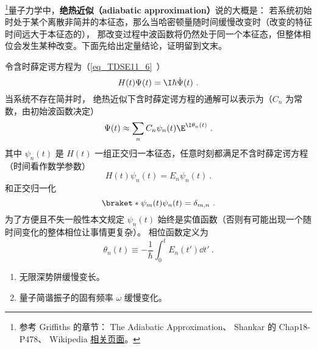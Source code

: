 
\begin{issues}
\issueTODO
\end{issues}


\footnote{参考 Griffiths\cite{GriffE} 的章节： The Adiabatic Approximation、 Shankar\cite{Shankar} 的 Chap18-P478、 Wikipedia \href{https://en.wikipedia.org/wiki/Adiabatic_theorem}{相关页面}。}量子力学中，\textbf{绝热近似（adiabatic approximation）}说的大概是： 若系统初始时处于某个离散非简并的本征态，那么当哈密顿量随时间缓慢改变时（改变的特征时间远大于本征态的）， 那改变过程中波函数将仍然处于同一个本征态，但整体相位会发生某种改变。下面先给出定量结论，证明留到文末。

令含时薛定谔方程为（\autoref{eq_TDSE11_6}~）
\begin{equation}
H(t)\Psi(t) = \I\hbar\dot\Psi(t)~.
\end{equation}
当系统不存在简并时， 绝热近似下含时薛定谔方程的通解可以表示为（$C_n$ 为常数，由初始波函数决定）
\begin{equation}\label{eq_AdiaQM_2}
\Psi(t) \approx \sum_n C_n \psi_n(t) \E^{\I\theta_n(t)}~.
\end{equation}
其中 $\psi_n(t)$ 是 $H(t)$ 一组正交归一本征态，任意时刻都满足不含时薛定谔方程（时间看作数学参数）
\begin{equation}\label{eq_AdiaQM_3}
H(t)\psi_n(t) = E_n\psi_n(t)~.
\end{equation}
和正交归一化
\begin{equation}\label{eq_AdiaQM_6}
\braket*{\psi_m(t)}{\psi_n(t)} = \delta_{m,n}~.
\end{equation}
为了方便且不失一般性本文规定 $\psi_n(t)$ 始终是实值函数（否则有可能出现一个随时间变化的整体相位让事情更复杂）。 相位函数定义为
\begin{equation}\label{eq_AdiaQM_8}
\theta_n(t) \equiv -\frac{1}{\hbar} \int_0^t E_n(t')\dd{t'}~.
\end{equation}

\begin{example}{}
\begin{enumerate}
\item 无限深势阱缓慢变长。
\item 量子简谐振子的固有频率 $\omega$ 缓慢变化。
\end{enumerate}
\end{example}

